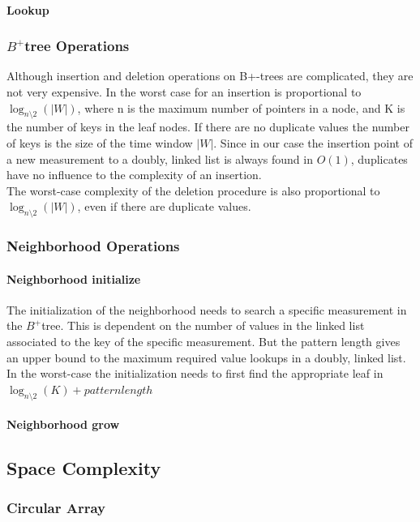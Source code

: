\documentclass[abstracton,12pt]{scrreprt}
\begin{document}
\paragraph{Lookup}

\subsubsection{$B^+$tree Operations}
Although insertion and deletion operations on B+-trees are complicated, they are not very expensive.
In the worst case for an insertion is proportional to $\log_{n\setminus2}(|W|)$, where n is
the maximum number of pointers in a node, and K is the number of keys in the leaf nodes. If there are no duplicate values the number of keys is the size of the time window $|W|$. 
Since in our case the insertion point of a new measurement to a doubly, linked list is always found in $O(1)$, duplicates have no influence to the complexity of an insertion.  
\\The worst-case complexity of the deletion procedure is also proportional to
$\log_{n\setminus2}(|W|)$, even if there are duplicate values.


\subsubsection{Neighborhood Operations}

\paragraph{Neighborhood initialize}
The initialization of the neighborhood needs to search a specific measurement in the $B^+$tree. 
This is dependent on the number of values in the linked list associated to the key of the specific measurement. 
But the pattern length gives an upper bound to the maximum required value lookups in a doubly, linked list. In the worst-case the initialization needs to first find the appropriate leaf in $\log_{n\setminus2}(K)+patternlength$
\paragraph{Neighborhood grow}


\subsection{Space Complexity}
\subsubsection{Circular Array}
\end{document}
